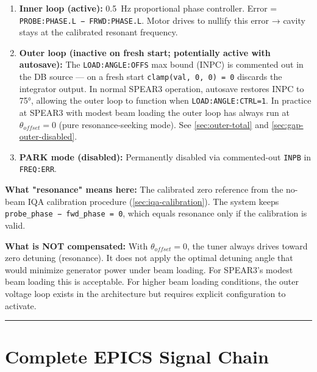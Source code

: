 \begin{enumerate}
\def\labelenumi{\arabic{enumi}.}
\item
  \textbf{Inner loop (active):} \qty{0.5}{\hertz} proportional phase controller. Error = \texttt{PROBE:\allowbreak{}PHASE.\allowbreak{}L\ −\ FRWD:\allowbreak{}PHASE.\allowbreak{}L}. Motor drives to nullify this error → cavity stays at the calibrated resonant frequency.
\item
  \textbf{Outer loop (inactive on fresh start; potentially active with autosave):} The \texttt{LOAD:\allowbreak{}ANGLE:\allowbreak{}OFFS} max bound (INPC) is commented out in the DB source --- on a fresh start \texttt{clamp(val,\allowbreak{}\ 0,\allowbreak{}\ 0)\ =\allowbreak{}\ 0} discards the integrator output. In normal SPEAR3 operation, autosave restores INPC to 75°, allowing the outer loop to function when \texttt{LOAD:\allowbreak{}ANGLE:\allowbreak{}CTRL=\allowbreak{}1}. In practice at SPEAR3 with modest beam loading the outer loop has always run at \(\theta_{offset} = 0\) (pure resonance-seeking mode). See \cref{sec:outer-total} and \cref{sec:gap-outer-disabled}.
\item
  \textbf{PARK mode (disabled):} Permanently disabled via commented-out \texttt{INPB} in \texttt{FREQ:ERR}.
\end{enumerate}

\textbf{What "resonance" means here:} The calibrated zero reference from the no-beam IQA calibration procedure (\cref{sec:iqa-calibration}). The system keeps \texttt{probe\_\allowbreak{}phase\ −\ fwd\_\allowbreak{}phase\ =\allowbreak{}\ 0}, which equals resonance only if the calibration is valid.

\textbf{What is NOT compensated:} With \(\theta_{offset} = 0\), the tuner always drives toward zero detuning (resonance). It does not apply the optimal detuning angle that would minimize generator power under beam loading. For SPEAR3's modest beam loading this is acceptable. For higher beam loading conditions, the outer voltage loop exists in the architecture but requires explicit configuration to activate.

\begin{center}\rule{0.5\linewidth}{0.5pt}\end{center}

\appendix

\appendix

\section{Complete EPICS Signal Chain}\label{app:signal-chain}


